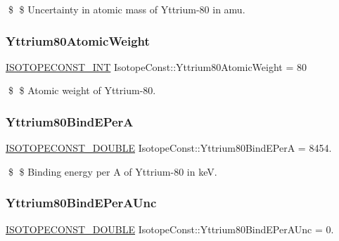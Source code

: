\$ \$ Uncertainty in atomic mass of Yttrium-\/80 in amu. \mbox{\label{group___isotope_const-_yttrium-_y80_ga7d45bf0c59f3a20a8d1017257114e2d4}} 
\subsubsection{\texorpdfstring{Yttrium80\+Atomic\+Weight}{Yttrium80AtomicWeight}}
{\footnotesize\ttfamily \mbox{\hyperlink{group___isotope_const-_macros_ga5f18360b3e99483a35c32d789e62621c}{I\+S\+O\+T\+O\+P\+E\+C\+O\+N\+S\+T\+\_\+\+I\+NT}} Isotope\+Const\+::\+Yttrium80\+Atomic\+Weight = 80}

\$ \$ Atomic weight of Yttrium-\/80. \mbox{\label{group___isotope_const-_yttrium-_y80_ga0379bccaffab110b86a3113273a56277}} 
\subsubsection{\texorpdfstring{Yttrium80\+Bind\+E\+PerA}{Yttrium80BindEPerA}}
{\footnotesize\ttfamily \mbox{\hyperlink{group___isotope_const-_macros_ga8f45a7272ce02c0b4c65c44636ed719a}{I\+S\+O\+T\+O\+P\+E\+C\+O\+N\+S\+T\+\_\+\+D\+O\+U\+B\+LE}} Isotope\+Const\+::\+Yttrium80\+Bind\+E\+PerA = 8454.}

\$ \$ Binding energy per A of Yttrium-\/80 in keV. \mbox{\label{group___isotope_const-_yttrium-_y80_gac381a9239bf742ced68e375541e58fae}} 
\subsubsection{\texorpdfstring{Yttrium80\+Bind\+E\+Per\+A\+Unc}{Yttrium80BindEPerAUnc}}
{\footnotesize\ttfamily \mbox{\hyperlink{group___isotope_const-_macros_ga8f45a7272ce02c0b4c65c44636ed719a}{I\+S\+O\+T\+O\+P\+E\+C\+O\+N\+S\+T\+\_\+\+D\+O\+U\+B\+LE}} Isotope\+Const\+::\+Yttrium80\+Bind\+E\+Per\+A\+Unc = 0.}

